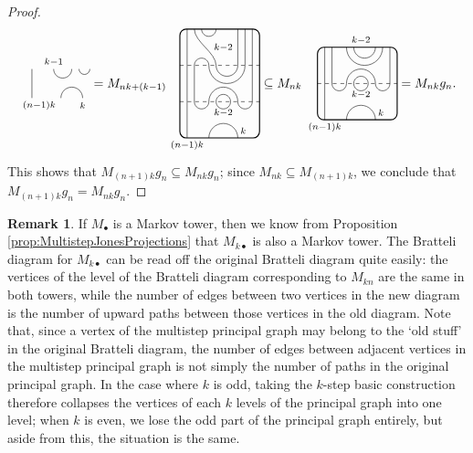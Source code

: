 \documentclass[11pt]{article}
\theoremstyle{plain}
\theoremstyle{definition}
\newtheorem{remark}[thm]{Remark}
\begin{document}
\begin{proof}
$$\begin{tikzpicture}[baseline = .3cm]
 \draw (.2,0) -- (.2,.8);
 \draw (.8,.8) arc (-180:0:.25cm);
 \draw (1.5,.8) arc (-180:0:.15cm);
 \draw (1,0) arc (180:0:.3cm);
 \node at (.8,1) {\scriptsize{$k{-}1$}};
 \node at (1.6,-.2) {\scriptsize{$k$}};
 \node at (.4,-.2) {\scriptsize{$(n{-}1)k$}};
\end{tikzpicture}
=
M_{nk+(k-1)}
\begin{tikzpicture}[baseline = 1.4cm]
 \draw[thick, rounded corners = 5pt] (0,0) rectangle (2.2,3);
 \draw (.2,0) -- (.2,3);
 \draw (.6,3) arc (-180:0:.2cm);
 \draw (.4,3) .. controls ++(270:.35cm) and ++(90:.35cm) .. (1,2) arc (-180:0:.3cm) -- (1.6,3);
 \draw (1.8,3) -- (1.8,2) arc (0:-180:.5cm) arc (0:180:.2cm) -- (.4,1) arc (-180:0:.2cm) arc (180:0:.4cm) arc (-180:0:.2cm) -- (2,3);
 \draw (1.2,1) circle (.2cm);
 \draw (.8,0) arc (180:0:.4cm);
 \draw[dashed] (0,1) -- (2.2,1);
 \draw[dashed] (0,2) -- (2.2,2);
 \node at (1.2,.7) {\scriptsize{$k{-}2$}};
 \node at (1.2,2.5) {\scriptsize{$k{-}2$}};
 \node at (1.75,.2) {\scriptsize{$k$}};
 \node at (.2,-.2) {\scriptsize{$(n{-}1)k$}};
\end{tikzpicture}
\subseteq
M_{nk}\,
\begin{tikzpicture}[baseline = .9cm]
 \draw[thick, rounded corners = 5pt] (0,0) rectangle (2.2,2);
 \draw (.2,0) -- (.2,2);
 \draw (1,2) arc (-180:0:.3cm);
 \draw (1.8,2) arc (0:-180:.5cm); 
 \draw (.4,2) -- (.4,1) arc (-180:0:.2cm) arc (180:0:.4cm) arc (-180:0:.2cm) -- (2,2);
 \draw (1.2,1) circle (.2cm);
 \draw (.8,0) arc (180:0:.4cm);
 \draw[dashed] (0,1) -- (2.2,1);
 \node at (1.2,.7) {\scriptsize{$k{-}2$}};
 \node at (1.2,2.2) {\scriptsize{$k{-}2$}};
 \node at (1.75,.2) {\scriptsize{$k$}};
 \node at (.2,-.2) {\scriptsize{$(n{-}1)k$}};
\end{tikzpicture}
=
M_{nk} g_n.
$$
This shows that $M_{(n+1)k}g_n\subseteq M_{nk}g_n$; since $M_{nk}\subseteq M_{(n+1)k}$, we conclude that $M_{(n+1)k}g_n=M_{nk}g_n$.
\end{proof}



\begin{remark}
 \label{Rem:MultistepTowerEffects}
If $M_\bullet$ is a Markov tower, then we know from Proposition \ref{prop:MultistepJonesProjections} that 
$M_{k\bullet}$ is also a Markov tower. 
The Bratteli diagram for $M_{k\bullet}$ can be read off the original Bratteli diagram quite easily: the vertices of the level of the Bratteli diagram corresponding to $M_{kn}$ are the same in both towers, while the number of edges between two vertices in the new diagram is the number of upward paths between those vertices in the old diagram.
Note that, since a vertex of the multistep principal graph may belong to the `old stuff' in the original Bratteli diagram, the number of edges between adjacent vertices in the multistep principal graph is not simply the number of paths in the original principal graph.
In the case where $k$ is odd, taking the $k$-step basic construction therefore collapses the vertices of each $k$ levels of the principal graph into one level; when $k$ is even, we lose the odd part of the principal graph entirely, but aside from this, the situation is the same.
\end{remark}
\end{document}
